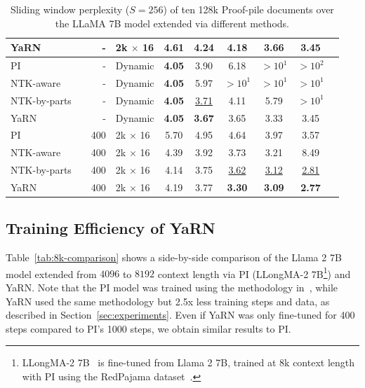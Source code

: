 \documentclass{article} %
\newcommand{\cmark}{\textcolor{green!80!black}{\ding{51}}}
\newcommand{\xmark}{\textcolor{red}{\ding{55}}}
\begin{document}
\begin{table}[h]
\begin{tabular}{lcrlcccccc}
        YaRN         & \xmark &   -  & 2k $\times$ 16 & 4.61 & 4.24 & 4.18 & 3.66 & 3.45 \\
        \midrule
        PI           & \xmark &   -  & Dynamic & \textbf{4.05} & 3.90 & 6.18 & $>10^1$ & $>10^2$ \\
        NTK-aware    & \xmark &   -  & Dynamic & \textbf{4.05} & 5.97 & $>10^1$ & $>10^1$ & $>10^1$ \\
        NTK-by-parts & \xmark &   -  & Dynamic & \textbf{4.05} & \underline{3.71} & 4.11 & 5.79 & $>10^1$ \\
        YaRN         & \xmark &   -  & Dynamic & \textbf{4.05} & \textbf{3.67} & 3.65 & 3.33 & 3.45 \\
        \midrule
        PI           & \cmark & 400  & 2k $\times$ 16 & 5.70 & 4.95 & 4.64 & 3.97 & 3.57 \\
        NTK-aware    & \cmark & 400  & 2k $\times$ 16 & 4.39 & 3.92 & 3.73 & 3.21 & 8.49 \\
        NTK-by-parts & \cmark & 400  & 2k $\times$ 16 & 4.14 & 3.75 & \underline{3.62} & \underline{3.12} & \underline{2.81} \\
        YaRN         & \cmark & 400  & 2k $\times$ 16 & 4.19 & 3.77 & \textbf{3.30} & \textbf{3.09} & \textbf{2.77} \\
        \bottomrule
    \end{tabular}
    \caption{\small Sliding window perplexity ($S=256$) of ten 128k Proof-pile documents over the LLaMA 7B model extended via different methods.}
    \label{tab:32k-comparison}
\end{table}


\newpage




\subsection{Training Efficiency of YaRN}\label{appendix:efficiency}

Table~\ref{tab:8k-comparison} shows a side-by-side comparison of the Llama 2 7B model extended from $4096$ to $8192$ context length via PI (LLongMA-2 7B\footnote{LLongMA-2 7B~\citep{llongma} is fine-tuned from Llama 2 7B, trained at 8k context length with PI using the RedPajama dataset~\citep{together2023redpajama}. }) and YaRN. Note that the PI model was trained using the methodology in~\citet{chen2023extending}, while YaRN used the same methodology but 2.5x less training steps and data, as described in Section~\ref{sec:experiments}. Even if YaRN was only fine-tuned for 400 steps compared to PI's 1000 steps, we obtain similar results to PI.
\end{document}
